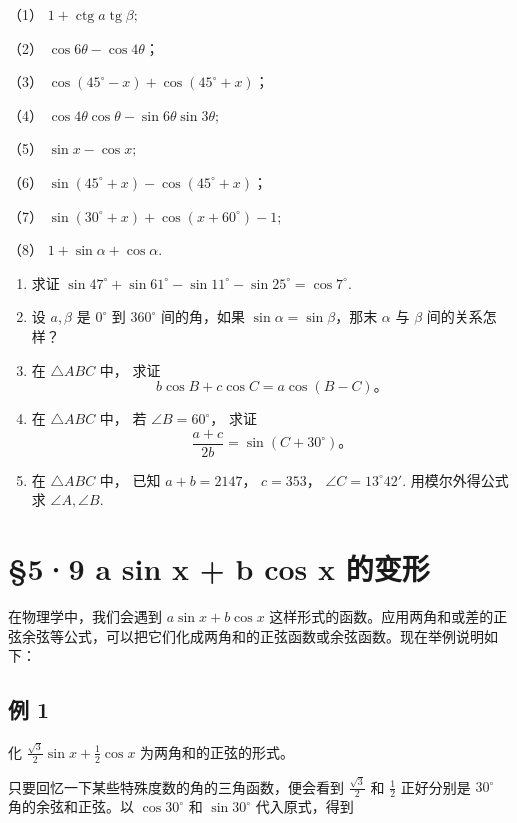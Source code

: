 （1） \(1 + \operatorname{ctg} a \operatorname{tg} \beta;\)

（2） \(\cos 6\theta - \cos 4\theta\)；

（3） \(\cos (45^{\circ} - x) + \cos (45^{\circ} + x)\)；

（4） \(\cos 4\theta \cos \theta - \sin 6\theta \sin 3\theta;\)

（5） \(\sin x - \cos x;\)

（6） \(\sin (45^{\circ} + x) - \cos (45^{\circ} + x)\)；

（7） \(\sin (30^{\circ} + x) + \cos (x + 60^{\circ}) - 1;\)

（8） \(1+\sin\alpha+\cos\alpha\).

\begin{enumerate}[start=5]
\item
  求证
  \(\sin 47^{\circ} + \sin 61^{\circ} - \sin 11^{\circ} - \sin 25^{\circ} = \cos 7^{\circ}\).
\item
  设 \(a, \beta\) 是 \(0^{\circ}\) 到 \(360^{\circ}\) 间的角，如果
  \(\sin \alpha = \sin \beta\)，那末 \(\alpha\) 与 \(\beta\)
  间的关系怎样？
\item
  在 \(\triangle ABC\) 中， 求证
\[
b \cos B + c \cos C = a \cos (B - C)\text{。}
\]
\item
  在 \(\triangle ABC\) 中， 若 \(\angle B = 60^{\circ}\)， 求证
\[
\frac {a + c}{2 b} = \sin (C + 30 ^{\circ})\text{。}
\]
\item
  在 \(\triangle ABC\) 中， 已知 \(a + b = 2147\)， \(c = 353\)，
  \(\angle C = 13^{\circ}42'\). 用模尔外得公式求 \(\angle A, \angle B\).
\end{enumerate}

\section{§5·9 a sin x + b cos x 的变形}\label{a-sin-x-b-cos-x-ux7684ux53d8ux5f62}

在物理学中，我们会遇到 \(a \sin x + b \cos x\)
这样形式的函数。应用两角和或差的正弦余弦等公式，可以把它们化成两角和的正弦函数或余弦函数。现在举例说明如下：

\subsection{例 1}

化 \(\frac{\sqrt{3}}{2}\sin x + \frac{1}{2}\cos x\)
为两角和的正弦的形式。

 只要回忆一下某些特殊度数的角的三角函数，便会看到
\(\frac{\sqrt{3}}{2}\) 和 \(\frac{1}{2}\) 正好分别是 \(30^{\circ}\)
角的余弦和正弦。以 \(\cos 30^{\circ}\) 和 \(\sin 30^{\circ}\)
代入原式，得到

